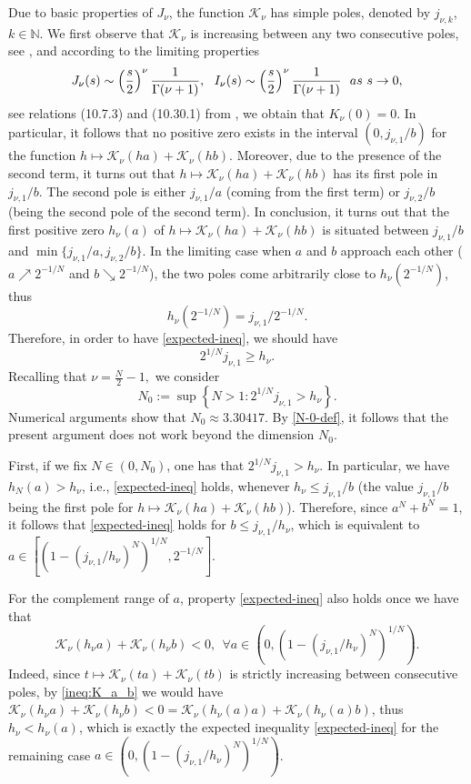 \documentclass[11pt, reqno]{amsart}
\numberwithin{equation}{section}
\begin{document}
		Due to basic properties of  $J_\nu$, the function $\mathcal K_\nu$ has simple poles, denoted by $j_{\nu,k}$, $k\in \mathbb N$. 
		We first observe that $\mathcal K_\nu$ is increasing between any two consecutive poles, see \cite{A-B-Duke}, 
		and according to the limiting properties 
		\begin{equation}\label{limiting-J-I}
			J_\nu(s)\sim \left(\frac{s}{2}\right)^\nu\frac{1}{\Gamma(\nu+1)},\ \ I_\nu(s)\sim \left(\frac{s}{2}\right)^\nu\frac{1}{\Gamma(\nu+1)}\ \ {\rm as}\ s\to 0,
		\end{equation}
		see relations (10.7.3) and (10.30.1) from \cite{Olver-etal}, we obtain that $K_\nu(0)=0.$ In particular, it follows that no positive zero exists in the interval $(0,j_{\nu,1}/b)$ for the function $h\mapsto \mathcal K_\nu(ha)+\mathcal K_\nu(hb)$. Moreover, due to the presence of the second term, it turns out that $h\mapsto \mathcal K_\nu(ha)+\mathcal K_\nu(hb)$ has its first pole in $j_{\nu,1}/b$. The second pole is either $j_{\nu,1}/a$ (coming from the first term) or $j_{\nu,2}/b$ (being the second pole of the second term). In conclusion, it turns out that the first positive zero $h_\nu(a)$ of $h\mapsto \mathcal K_\nu(ha)+\mathcal K_\nu(hb)$ is situated between $j_{\nu,1}/b$ and $\min\{j_{\nu,1}/a,j_{\nu,2}/b\}$. In the limiting case when $a$ and $b$ approach each other ($a\nearrow 2^{-1/N}$ and $b\searrow 2^{-1/N}$), the two poles come arbitrarily close to $h_\nu(2^{-1/N})$, thus $$h_\nu(2^{-1/N})=j_{\nu,1}/2^{-1/N}.$$
		Therefore, in order to have \eqref{expected-ineq}, we should have $$2^{1/N}j_{\nu,1}\geq h_\nu.$$
		Recalling that $\nu=\frac{N}{2}-1,$ we consider 
		\begin{equation}\label{N-0-def}
			N_0:=\sup\left\{N>1:2^{1/N}j_{\nu,1}> h_\nu\right\}.	
		\end{equation}
		Numerical arguments show that $N_0\approx 3.30417$. By \eqref{N-0-def}, it follows that the present argument does not work beyond the dimension $N_0.$ 
			
		First, if we fix $N\in (0,N_0)$, one has that $2^{1/N}j_{\nu,1}> h_\nu $. In particular, we have  $h_N(a)> h_\nu $, i.e., \eqref{expected-ineq} holds, whenever $h_\nu\leq j_{\nu,1}/b$ (the value $j_{\nu,1}/b$ being the first pole for $h\mapsto \mathcal K_\nu(ha)+\mathcal K_\nu(hb)$). Therefore, since $a^N+b^N=1$, it follows that \eqref{expected-ineq} holds for  $b\leq j_{\nu,1}/h_\nu$, which is equivalent to $a\in [(1-(j_{\nu,1}/h_\nu)^N)^{1/N},2^{-1/N}].$ 
		
		For the complement range of $a$, property \eqref{expected-ineq} also holds  once  we have that 
		\begin{equation}\label{ineq:K_a_b}
			\mathcal K_\nu(h_\nu a)+\mathcal K_\nu(h_\nu b)<0,\ \ \forall a\in (0,(1-(j_{\nu,1}/h_\nu)^N)^{1/N}).
		\end{equation}
		 Indeed, since $t\mapsto \mathcal K_\nu(t a)+\mathcal K_\nu(t b)$ is strictly increasing between consecutive poles, by \eqref{ineq:K_a_b} we would have $\mathcal K_\nu(h_\nu a)+\mathcal K_\nu(h_\nu b)<0=\mathcal K_\nu(h_\nu(a) a)+\mathcal K_\nu(h_\nu(a) b)$, thus $h_\nu<h_\nu(a)$, which is exactly the expected inequality \eqref{expected-ineq} for the remaining case $a\in (0,(1-(j_{\nu,1}/h_\nu)^N)^{1/N})$. 
		 
\end{document}
